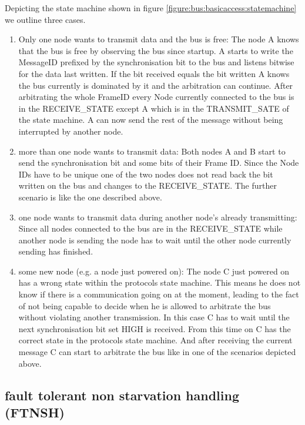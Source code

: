 \documentclass[11pt,a4paper,oneside]{report}
\begin{document}
Depicting the state machine shown in figure \ref{figure:bus:basicaccess:statemachine} we outline three cases.

\begin{enumerate}
 \item Only one node wants to transmit data and the bus is free: The node A knows that the bus is free by observing the bus since startup. A starts to write the MessageID prefixed by the synchronisation bit to the bus and listens bitwise for the data last written.
       If the bit received equals the bit written A knows the bus currently is dominated by it and the arbitration can continue. After arbitrating the whole FrameID every Node currently connected to the bus is in the RECEIVE\_STATE except A which is in the TRANSMIT\_SATE of the state machine.
       A can now send the rest of the message without being interrupted by another node.

 \item more than one node wants to transmit data: Both nodes A and B start to send the synchronisation bit and some bits of their Frame ID. Since the Node IDs have to be unique one of the two nodes does not read back the bit written on the bus and changes to the RECEIVE\_STATE. The further scenario is like the one described above.

 \item one node wants to transmit data during another node's already transmitting: Since all nodes connected to the bus are in the RECEIVE\_STATE while another node is sending the node has to wait until the other node currently sending has finished.

 \item some new node (e.g. a node just powered on): The node C just powered on has a wrong state within the protocols state machine. This means he does not know if there is a communication going on at the moment, leading to the fact of not being capable to decide when he is allowed to arbitrate the bus without violating another transmission.
       In this case C has to wait until the next synchronisation bit set HIGH is received. From this time on C has the correct state in the protocols state machine. And after receiving the current message C can start to arbitrate the bus like in one of the scenarios depicted above.
\end{enumerate}

\subsection{fault tolerant non starvation handling (FTNSH)}
\label{sec:bus:ftnsh}
\end{document}
